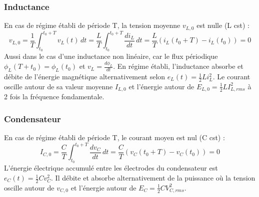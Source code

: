 		\subsubsection{Inductance}
			En cas de régime établi de période T, la tension moyenne $v_{L,0}$ est nulle (L cst) :
			\begin{equation}
				v_{L,0} = \frac{1}{T}\int _{t_0}^{t_0+T} v_L (t)\, dt = \frac{L}{T}\int _{t_0}^{t_0+T} \frac{di_L}{dt}\, dt = \frac{L}{T}\left(i_L(t_0 + T) - i_L(t_0)\right) = 0
			\end{equation}
			Aussi dans le cas d'une inductance non linéaire, car le flux périodique $\phi _L(T+t_0) = \phi _L (t_0)$ et $v_L = \frac{d\phi _L}{dt}$. En régime établi, l'inductance absorbe et débite de l'énergie magnétique alternativement selon $e_L(t) = \frac{1}{2} Li_L^2$. Le courant oscille autour de sa valeur moyenne $I_{L,0}$ et l'énergie autour de $E_{L,0}=\frac{1}{2} L I_{L,rms}^2$ à 2 fois la fréquence fondamentale. 
			
		\subsubsection{Condensateur}
			En cas de régime établi de période T, le courant moyen est nul (C cst) : 
			\begin{equation}
				I_{C,0} = \frac{C}{T}\int _{t_0}^{t_0+T} \frac{dv_C}{dt} \, dt = \frac{C}{T} (v_{C}(t_0+T)-v_C(t_0)) = 0
			\end{equation}
			L'énergie électrique accumulé entre les électrodes du condensateur est $e_C(t) = \frac{1}{2}Cv^2_C$. Il débite et absorbe alternativement de la puissance où la tension oscille autour de $v_{C,0}$ et l'énergie autour de $E_C = \frac{1}{2} C V_{C,rms}^2$. 